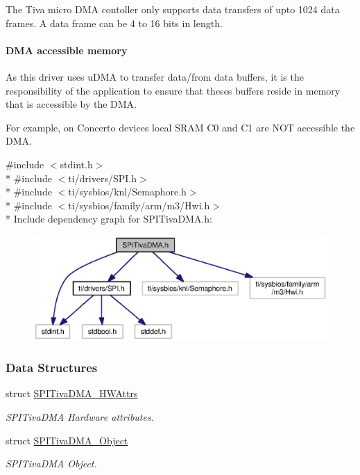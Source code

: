 The Tiva micro D\+M\+A contoller only supports data transfers of upto 1024 data frames. A data frame can be 4 to 16 bits in length.

\paragraph*{D\+M\+A accessible memory}

As this driver uses u\+D\+M\+A to transfer data/from data buffers, it is the responsibility of the application to ensure that theses buffers reside in memory that is accessible by the D\+M\+A.

For example, on Concerto devices local S\+R\+A\+M C0 and C1 are N\+O\+T accessible the D\+M\+A. 

{\ttfamily \#include $<$stdint.\+h$>$}\\*
{\ttfamily \#include $<$ti/drivers/\+S\+P\+I.\+h$>$}\\*
{\ttfamily \#include $<$ti/sysbios/knl/\+Semaphore.\+h$>$}\\*
{\ttfamily \#include $<$ti/sysbios/family/arm/m3/\+Hwi.\+h$>$}\\*
Include dependency graph for S\+P\+I\+Tiva\+D\+M\+A.\+h\+:
\nopagebreak
\begin{figure}[H]
\begin{center}
\leavevmode
\includegraphics[width=350pt]{_s_p_i_tiva_d_m_a_8h__incl}
\end{center}
\end{figure}
\subsubsection*{Data Structures}
\begin{DoxyCompactItemize}
\item 
struct \hyperlink{struct_s_p_i_tiva_d_m_a___h_w_attrs}{S\+P\+I\+Tiva\+D\+M\+A\+\_\+\+H\+W\+Attrs}
\begin{DoxyCompactList}\small\item\em S\+P\+I\+Tiva\+D\+M\+A Hardware attributes. \end{DoxyCompactList}\item 
struct \hyperlink{struct_s_p_i_tiva_d_m_a___object}{S\+P\+I\+Tiva\+D\+M\+A\+\_\+\+Object}
\begin{DoxyCompactList}\small\item\em S\+P\+I\+Tiva\+D\+M\+A Object. \end{DoxyCompactList}\end{DoxyCompactItemize}
